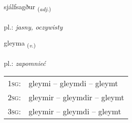 \documentclass[frontgrid, backgrid]{flacards}\usepackage[]{graphicx}\usepackage[]{xcolor}
\begin{document}
\renewcommand{\flhead}{\vskip5pt \fboxsep=0pt {\small\bfseries\footnotesize Lýsingarorð | przymiotnik}}
\renewcommand{\fcfoot}{\vskip5pt \fboxsep=0pt \hspace{2pt}{\small\bfseries\footnotesize 1K}}

\renewcommand{\blhead}{\vskip5pt {\small\bfseries\footnotesize Lýsingarorð | przymiotnik }}
\renewcommand{\bcfoot}{\vskip5pt \hspace{2pt}{\small\bfseries\footnotesize 1K}}


{sjálfsagður \small{\textsubscript{(\textit{adj.})}} \\[1ex] %
\textphonetic{[sjaulfsaɣðʏr]} \\
pl.: \emph{jasny, oczywisty} \\  [2ex]
\renewcommand*{\arraystretch}{0.8}
}

\renewcommand{\flhead}{\vskip5pt \fboxsep=0pt {\small\bfseries\footnotesize Sagnorð | czasownik}}
\renewcommand{\fcfoot}{\vskip5pt \fboxsep=0pt \hspace{2pt}{\small\bfseries\footnotesize 1K}}

\renewcommand{\blhead}{\vskip5pt {\small\bfseries\footnotesize Sagnorð | czasownik }}
\renewcommand{\bcfoot}{\vskip5pt \hspace{2pt}{\small\bfseries\footnotesize 1K}}


{gleyma \small{\textsubscript{(\textit{v.})}} \\[1ex] %
\textphonetic{[kleiːma]} \\
pl.: \emph{zapomnieć} \\  [2ex]
\renewcommand*{\arraystretch}{0.8}
\begin{tabular}{p{1cm}l}
\textsc{1sg}: & gleymi -- gleymdi -- gleymt \\ 
\textsc{2sg}: & gleymir -- gleymdir -- gleymt \\ 
\textsc{3sg}: & gleymir -- gleymdi -- gleymt \\ 
\end{tabular}
}
\end{document}
